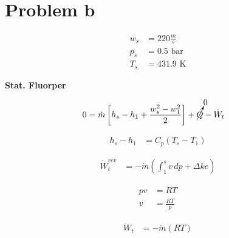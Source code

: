 \section*{Problem b}

\begin{align*}
w_s &= 220 \frac{m}{s} \\
p_s &= 0.5 \text{ bar} \\
T_s &= 431.9 \text{ K}
\end{align*}

\textbf{Stat. Fluorper}

\begin{align*}
0 &= \dot{m} \left[ h_s - h_1 + \frac{w_s^2 - w_1^2}{2} \right] + \cancelto{0}{\dot{Q}} - \dot{W}_t
\end{align*}

\begin{align*}
h_s - h_1 &= C_p (T_s - T_1)
\end{align*}

\begin{align*}
\dot{W}_t^{rev} &= - \dot{m} \left( \int_{1}^{s} v \, dp + \Delta ke \right)
\end{align*}

\begin{align*}
pv &= RT \\
v &= \frac{RT}{p}
\end{align*}

\begin{align*}
\dot{W}_t &= - \dot{m} \left( RT \right)
\end{align*}